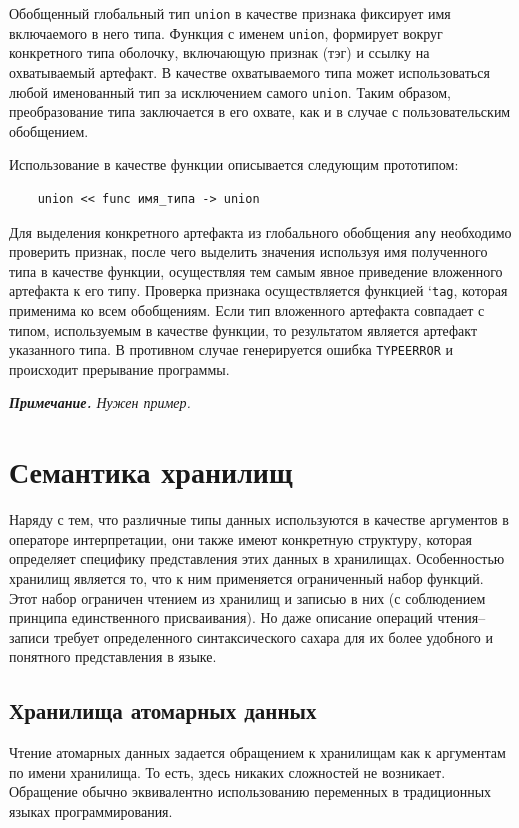 Обобщенный глобальный тип \verb|union| в качестве признака фиксирует имя включаемого в него типа. Функция с именем \verb|union|, формирует вокруг конкретного типа оболочку, включающую признак (тэг) и ссылку на охватываемый артефакт. В качестве охватываемого типа может использоваться любой именованный тип за исключением самого \verb|union|. Таким образом, преобразование типа заключается в его охвате, как и в случае с пользовательским обобщением.

Использование в качестве функции описывается следующим прототипом:
\begin{verbatim}
    union << func имя_типа -> union
\end{verbatim}

Для выделения конкретного артефакта из глобального обобщения \verb|any| необходимо проверить признак, после чего выделить значения используя имя полученного типа в качестве функции, осуществляя тем самым явное приведение вложенного артефакта к его типу. Проверка признака осуществляется функцией `\verb|tag|, которая применима ко всем обобщениям. Если тип вложенного артефакта совпадает с типом, используемым в качестве функции, то результатом является артефакт указанного типа. В противном случае генерируется ошибка \verb|TYPEERROR| и происходит прерывание программы.

\textit{\textbf{Примечание.}
Нужен пример.}

\section{Семантика хранилищ}

Наряду с тем, что различные типы данных используются в качестве аргументов в операторе интерпретации, они также имеют конкретную структуру, которая определяет специфику представления этих данных в хранилищах. Особенностью хранилищ является то, что к ним применяется ограниченный набор функций. Этот набор ограничен чтением из хранилищ и записью в них (с соблюдением принципа единственного присваивания). Но даже описание операций чтения--записи требует определенного синтаксического сахара для их более удобного и понятного представления в языке.

\subsection{Хранилища атомарных данных}

Чтение атомарных данных задается обращением к хранилищам как к аргументам по имени хранилища. То есть, здесь никаких сложностей не возникает. Обращение обычно эквивалентно использованию переменных в традиционных языках программирования.

